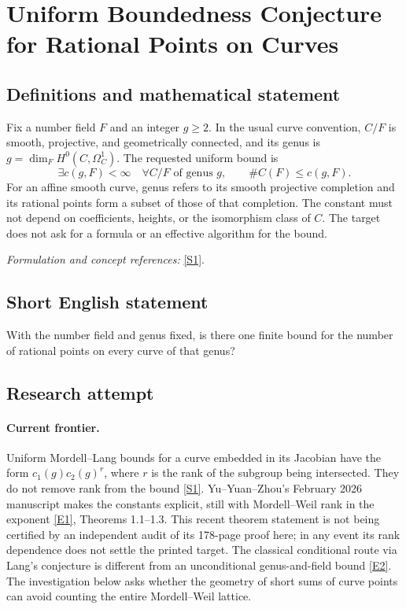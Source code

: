 \documentclass[11pt,a4paper]{article}
\newcommand{\sref}[2]{\hyperlink{source:#1:#2}{[S#2]}}
\newcommand{\eref}[2]{\hyperlink{extra:#1:#2}{[E#2]}}
\newif\ifshowcatalogue
\newcommand{\cataloguescope}[1]{\ifshowcatalogue
 \paragraph{Exact scope in the supplied catalogue.}
 \begin{quote}\small #1\end{quote}\fi}
\numberwithin{equation}{section}
\begin{document}
\setcounter{section}{0}
\clearpage
\section*{\texorpdfstring{Uniform Boundedness Conjecture for Rational Points on Curves}{Uniform Boundedness Conjecture for Rational Points on Curves}}\label{statement}
\subsection{Definitions and mathematical statement}
Fix a number field $F$ and an integer $g\ge2$. In the usual curve convention, $C/F$ is smooth, projective, and geometrically connected, and its genus is $g=\dim_F H^0(C,\Omega_C^1)$. The requested uniform bound is
\[
 \exists c(g,F)<\infty\quad\forall C/F\text{ of genus }g,
 \qquad\#C(F)\le c(g,F).
\]
For an affine smooth curve, genus refers to its smooth projective completion and its rational points form a subset of those of that completion. The constant must not depend on coefficients, heights, or the isomorphism class of $C$. The target does not ask for a formula or an effective algorithm for the bound.
\par\smallskip\textit{Formulation and concept references:} \sref{statement}{1}.
\cataloguescope{For each integer g >= 2 and number field F, prove that there is a constant c(g,F) such that every smooth curve C of genus g over F has at most c(g,F) F-rational points.}
\subsection{Short English statement}
With the number field and genus fixed, is there one finite bound for the number of rational points on every curve of that genus?
\subsection{Research attempt}

\paragraph{Current frontier.}
Uniform Mordell--Lang bounds for a curve embedded in its Jacobian have
the form $c_1(g)c_2(g)^r$, where $r$ is the rank of the subgroup being
intersected. They do not remove rank from the bound
\sref{statement}{1}. Yu--Yuan--Zhou's February 2026 manuscript makes the
constants explicit, still with Mordell--Weil rank in the exponent
\eref{statement}{1}, Theorems 1.1--1.3. This recent theorem statement is not
being certified by an independent audit of its 178-page proof here; in
any event its rank dependence does not settle the printed target.
The classical conditional route via Lang's conjecture is different from
an unconditional genus-and-field bound \eref{statement}{2}. The investigation
below asks whether the geometry of short sums of curve points can avoid
counting the entire Mordell--Weil lattice.
\end{document}
